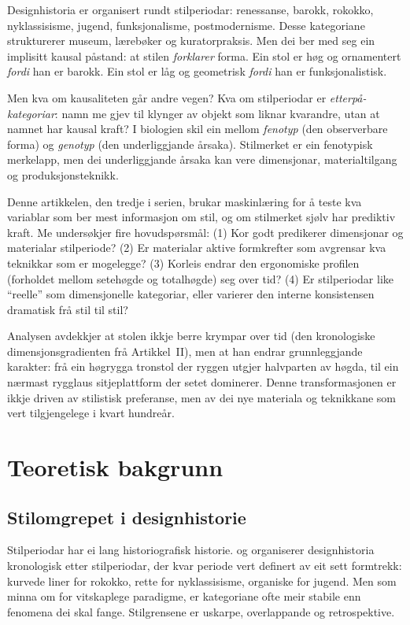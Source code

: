 \documentclass[10pt, a4paper, twocolumn]{article}
\begin{document}
Designhistoria er organisert rundt stilperiodar: renessanse, barokk, rokokko, nyklassisisme, jugend, funksjonalisme, postmodernisme. Desse kategoriane strukturerer museum, lærebøker og kuratorpraksis. Men dei ber med seg ein implisitt kausal påstand: at stilen \emph{forklarer} forma. Ein stol er høg og ornamentert \emph{fordi} han er barokk. Ein stol er låg og geometrisk \emph{fordi} han er funksjonalistisk.

Men kva om kausaliteten går andre vegen? Kva om stilperiodar er \emph{etterpå-kategoriar}: namn me gjev til klynger av objekt som liknar kvarandre, utan at namnet har kausal kraft? I biologien skil ein mellom \emph{fenotyp} (den observerbare forma) og \emph{genotyp} (den underliggjande årsaka). Stilmerket er ein fenotypisk merkelapp, men dei underliggjande årsaka kan vere dimensjonar, materialtilgang og produksjonsteknikk.

Denne artikkelen, den tredje i serien, brukar maskinlæring for å teste kva variablar som ber mest informasjon om stil, og om stilmerket sjølv har prediktiv kraft. Me undersøkjer fire hovudspørsmål: (1) Kor godt predikerer dimensjonar og materialar stilperiode? (2) Er materialar aktive formkrefter som avgrensar kva teknikkar som er mogelegge? (3) Korleis endrar den ergonomiske profilen (forholdet mellom setehøgde og totalhøgde) seg over tid? (4) Er stilperiodar like ``reelle'' som dimensjonelle kategoriar, eller varierer den interne konsistensen dramatisk frå stil til stil?

Analysen avdekkjer at stolen ikkje berre krympar over tid (den kronologiske dimensjonsgradienten frå Artikkel~II), men at han endrar grunnleggjande karakter: frå ein høgrygga tronstol der ryggen utgjer halvparten av høgda, til ein nærmast rygglaus sitjeplattform der setet dominerer. Denne transformasjonen er ikkje driven av stilistisk preferanse, men av dei nye materiala og teknikkane som vert tilgjengelege i kvart hundreår.


\section{Teoretisk bakgrunn}

\subsection{Stilomgrepet i designhistorie}

Stilperiodar har ei lang historiografisk historie. \citet{lucie-smith1993} og \citet{raizman2010} organiserer designhistoria kronologisk etter stilperiodar, der kvar periode vert definert av eit sett formtrekk: kurvede liner for rokokko, rette for nyklassisisme, organiske for jugend. Men som \citet{kuhn1962} minna om for vitskaplege paradigme, er kategoriane ofte meir stabile enn fenomena dei skal fange. Stilgrensene er uskarpe, overlappande og retrospektive.
\end{document}

